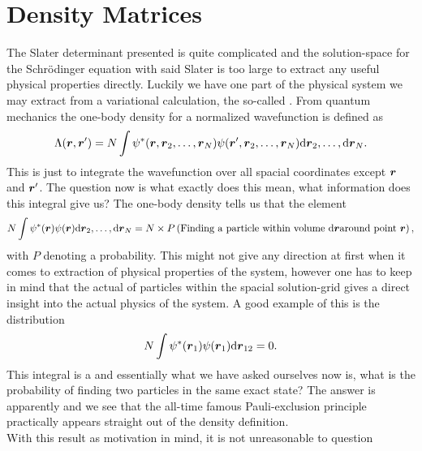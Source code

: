 \section{Density Matrices\label{sec:densityMat}}
    The Slater determinant presented is quite complicated and the
    solution-space for the Schrödinger equation with said Slater is too large
    to extract any useful physical properties directly.  Luckily we have one
    part of the physical system we may extract from a variational calculation,
    the so-called . From quantum mechanics the one-body
    density for a normalized wavefunction is defined as
        \begin{equation}
            \Lambda(\boldsymbol{{r}},\boldsymbol{{r}}') = N\int
            \psi^{*}(\boldsymbol{{r}},\boldsymbol{{r}}_2,\dots,\boldsymbol{{r}}_N)
            \psi(\boldsymbol{{r}}',\boldsymbol{{r}}_2,\dots,\boldsymbol{{r}}_N)\mathrm{d}\boldsymbol{{r}}_2,\dots,\mathrm{d}\boldsymbol{{r}}_N.
        \end{equation}
    This is just to integrate the wavefunction over all spacial coordinates
    except $\boldsymbol{{r}}$ and $\boldsymbol{{r}}'$. The question now is what exactly does
    this mean, what information does this integral give us? The one-body
    density tells us that the element
        \begin{equation}
            N\int
            \psi^{*}(\boldsymbol{{r}})\psi(\boldsymbol{{r}})\mathrm{d}\boldsymbol{{r}}_2,\dots,\mathrm{d}\boldsymbol{{r}}_N =
            N\times P\left(\text{Finding a particle within volume } \mathrm{d}\boldsymbol{{r}}
            \text{around point } \boldsymbol{{r}}\right),
        \end{equation}
    with $P$ denoting a probability. This might not give any direction at first
    when it comes to extraction of physical properties of the system, however
    one has to keep in mind that the actual  of particles
    within the spacial solution-grid gives a direct insight into the actual
    physics of the system. A good example of this is the distribution
    \cite{onebodydens}
        \begin{equation}
            N\int \psi^{*}(\boldsymbol{{r}}_1)\psi(\boldsymbol{{r}}_1)\mathrm{d}\boldsymbol{{r}}_{12} = 0.
        \end{equation}
    This integral is a  and essentially what we have
    asked ourselves now is, what is the probability of finding two particles in
    the same exact state? The answer is apparently  and we see that
    the all-time famous Pauli-exclusion principle practically appears straight
    out of the density definition. \\
    With this result as motivation in mind, it is not unreasonable to question
